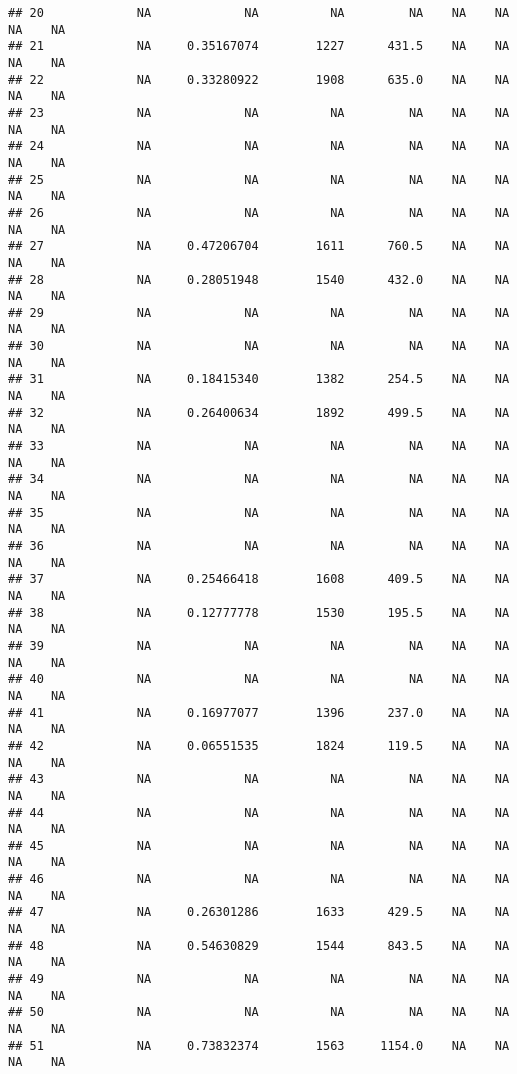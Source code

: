 \documentclass[]{article}
\begin{document}
\begin{verbatim}
## 20             NA             NA          NA         NA    NA    NA    NA    NA
## 21             NA     0.35167074        1227      431.5    NA    NA    NA    NA
## 22             NA     0.33280922        1908      635.0    NA    NA    NA    NA
## 23             NA             NA          NA         NA    NA    NA    NA    NA
## 24             NA             NA          NA         NA    NA    NA    NA    NA
## 25             NA             NA          NA         NA    NA    NA    NA    NA
## 26             NA             NA          NA         NA    NA    NA    NA    NA
## 27             NA     0.47206704        1611      760.5    NA    NA    NA    NA
## 28             NA     0.28051948        1540      432.0    NA    NA    NA    NA
## 29             NA             NA          NA         NA    NA    NA    NA    NA
## 30             NA             NA          NA         NA    NA    NA    NA    NA
## 31             NA     0.18415340        1382      254.5    NA    NA    NA    NA
## 32             NA     0.26400634        1892      499.5    NA    NA    NA    NA
## 33             NA             NA          NA         NA    NA    NA    NA    NA
## 34             NA             NA          NA         NA    NA    NA    NA    NA
## 35             NA             NA          NA         NA    NA    NA    NA    NA
## 36             NA             NA          NA         NA    NA    NA    NA    NA
## 37             NA     0.25466418        1608      409.5    NA    NA    NA    NA
## 38             NA     0.12777778        1530      195.5    NA    NA    NA    NA
## 39             NA             NA          NA         NA    NA    NA    NA    NA
## 40             NA             NA          NA         NA    NA    NA    NA    NA
## 41             NA     0.16977077        1396      237.0    NA    NA    NA    NA
## 42             NA     0.06551535        1824      119.5    NA    NA    NA    NA
## 43             NA             NA          NA         NA    NA    NA    NA    NA
## 44             NA             NA          NA         NA    NA    NA    NA    NA
## 45             NA             NA          NA         NA    NA    NA    NA    NA
## 46             NA             NA          NA         NA    NA    NA    NA    NA
## 47             NA     0.26301286        1633      429.5    NA    NA    NA    NA
## 48             NA     0.54630829        1544      843.5    NA    NA    NA    NA
## 49             NA             NA          NA         NA    NA    NA    NA    NA
## 50             NA             NA          NA         NA    NA    NA    NA    NA
## 51             NA     0.73832374        1563     1154.0    NA    NA    NA    NA

\end{verbatim}
\end{document}
